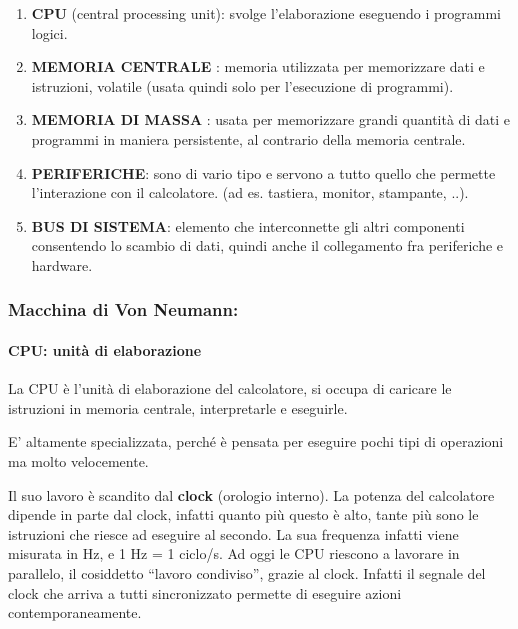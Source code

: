 \documentclass[
  paper=a4,
  oneside  ,captions=tableheading
]{scrbook}
\providecommand{\tightlist}{%
  \setlength{\itemsep}{0pt}\setlength{\parskip}{0pt}}
\begin{document}
\begin{enumerate}
\def\labelenumi{\arabic{enumi}.}
\tightlist
\item
  \textbf{CPU} (central processing unit): svolge l'elaborazione
  eseguendo i programmi logici.
\item
  \textbf{MEMORIA CENTRALE }: memoria utilizzata per memorizzare dati e
  istruzioni, volatile (usata quindi solo per l'esecuzione di
  programmi).
\item
  \textbf{MEMORIA DI MASSA }: usata per memorizzare grandi quantità di
  dati e programmi in maniera persistente, al contrario della memoria
  centrale.
\item
  \textbf{PERIFERICHE}: sono di vario tipo e servono a tutto quello che
  permette l'interazione con il calcolatore. (ad es. tastiera, monitor,
  stampante, ..).
\item
  \textbf{BUS DI SISTEMA}: elemento che interconnette gli altri
  componenti consentendo lo scambio di dati, quindi anche il
  collegamento fra periferiche e hardware.
\end{enumerate}

\hypertarget{macchina-di-von-neumann}{%
\subsubsection{Macchina di Von Neumann:}\label{macchina-di-von-neumann}}

\hypertarget{cpu-unituxe0-di-elaborazione}{%
\paragraph{CPU: unità di
elaborazione}\label{cpu-unituxe0-di-elaborazione}}

La CPU è l'unità di elaborazione del calcolatore, si occupa di caricare
le istruzioni in memoria centrale, interpretarle e eseguirle.

E' altamente specializzata, perché è pensata per eseguire pochi tipi di
operazioni ma molto velocemente.

Il suo lavoro è scandito dal \textbf{clock} (orologio interno). La
potenza del calcolatore dipende in parte dal clock, infatti quanto più
questo è alto, tante più sono le istruzioni che riesce ad eseguire al
secondo. La sua frequenza infatti viene misurata in Hz, e 1 Hz = 1
ciclo/s. Ad oggi le CPU riescono a lavorare in parallelo, il cosiddetto
``lavoro condiviso'', grazie al clock. Infatti il segnale del clock che
arriva a tutti sincronizzato permette di eseguire azioni
contemporaneamente.
\end{document}
